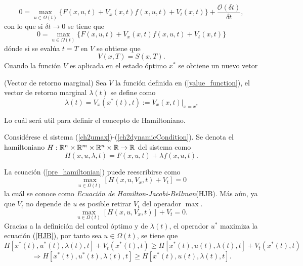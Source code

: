\begin{equation}
    0 = \max_{u\in \Omega(t)} \{F(x,u,t) + V_x(x,t)f(x,u,t) + V_t(x,t)\} + \frac{\mathcal O(\delta t)}{\delta t},
\end{equation}
con lo que si $\delta t \to 0$ se tiene que 
\begin{equation}
    \label{pre_hamiltonian}
    0 = \max_{u\in \Omega(t)} \{F(x,u,t) + V_x(x,t)f(x,u,t) + V_t(x,t)\}
\end{equation}
dónde si se evalúa $t=T$ en $V$ se obtiene que 
\begin{equation}
    V(x,T) = S(x,T).
\end{equation}
Cuando la función $V$ es aplicada en el estado óptimo $x^*$ se obtiene un nuevo vetor
\begin{definition}(Vector de retorno marginal)
    Sea $V$ la función definida en (\ref{value_function}), el vector de retorno marginal $\lambda(t)$ se define como
    \begin{equation}
        \label{marginal_eq}
        \lambda(t) = V_x(x^*(t),t):=V_x(x,t)|_{x=x^*}
    \end{equation}
\end{definition}
Lo cuál será util para definir el concepto de Hamiltoniano.
\begin{definition}
    Considérese el sistema (\ref{ch2umax})-(\ref{ch2dynamicCondition}). Se denota el hamiltoniano $H: \mathbb R^n\times \mathbb R^m \times \mathbb R^n \times \mathbb R \to \mathbb R$ del sistema como 
    \begin{equation}
        \label{hamiltonian_def_eq}
        H(x,u,\lambda, t) = F(x,u,t) + \lambda f(x,u,t).
    \end{equation}
\end{definition}
La ecuación (\ref{pre_hamiltonian}) puede reescribirse como
\begin{equation}
    \max_{u\in \Omega(t)}[H(x,u,V_x,t) + V_t] = 0
\end{equation}
la cuál se conoce como \textsl{Ecuación de Hamilton-Jacobi-Bellman}(HJB). Más aún, ya que $V_t$ no depende de $u$ es posible retirar $V_t$ del operador $\max$.
\begin{equation}
    \label{HJB}
    \max_{u\in \Omega(t)}[H(x,u,V_x,t)] + V_t = 0.
\end{equation}
Gracias a la definición del control óptimo y de $\lambda(t)$, el operador $u^*$ maximiza la ecuación (\ref{HJB}), por tanto sea $u\in \Omega(t)$, se tiene que
\begin{equation}
    H[x^*(t), u^*(t), \lambda(t), t] + V_t(x^*(t),t ) \geq H[x^*(t), u(t), \lambda(t), t] + V_t(x^*(t),t )
\end{equation}
\begin{equation}
    \Rightarrow H[x^*(t), u^*(t), \lambda(t), t]  \geq H[x^*(t), u(t), \lambda(t), t].
\end{equation}

